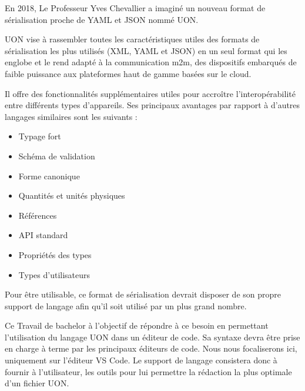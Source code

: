 
En 2018, Le Professeur Yves Chevallier a imaginé un nouveau format de sérialisation proche de YAML et JSON nommé UON.

UON vise à rassembler toutes les caractéristiques utiles des formats de sérialisation les plus utilisés (XML, YAML et JSON) en un seul format qui les englobe et le rend adapté à la communication m2m, des dispositifs embarqués de faible puissance aux plateformes haut de gamme basées sur le cloud.

Il offre des fonctionnalités supplémentaires utiles pour accroître l'interopérabilité entre différents types d'appareils. Ses principaux avantages par rapport à d'autres langages similaires sont les suivants :



\begin{itemize}
    \item Typage fort
    \item Schéma de validation
    \item Forme canonique
    \item Quantités et unités physiques
    \item Références
    \item API standard
    \item Propriétés des types
    \item Types d'utilisateurs
\end{itemize}

Pour être utilisable, ce format de sérialisation devrait disposer de son propre support de langage afin qu'il soit utilisé par un plus grand nombre.

Ce Travail de bachelor à l'objectif de répondre à ce besoin en permettant l'utilisation du langage UON dans un éditeur de code.
Sa syntaxe devra être prise en charge à terme par les principaux éditeurs de code. Nous nous focaliserons ici, uniquement sur l'éditeur VS Code.
Le support de langage consistera donc à fournir à l'utilisateur, les outils pour lui permettre la rédaction la plus optimale d'un fichier UON.

